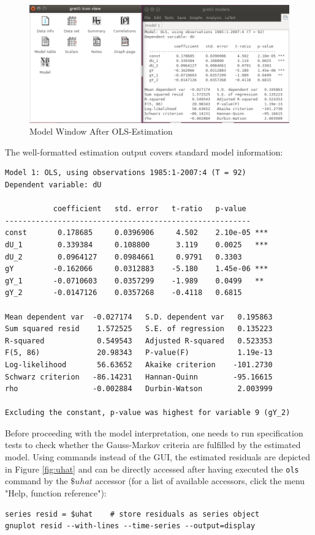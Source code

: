 \documentclass[11pt]{article}
\begin{document}
\begin{figure}[!h]
	\centering
	\includegraphics[width=.72\textwidth]{../figures/gui_model}
	\caption{Model Window After OLS-Estimation}
	\label{fig:gui_model}
\end{figure}


The well-formatted estimation output covers standard model information:
\begin{Verbatim}[baselinestretch=0.75, fontsize=\small]
Model 1: OLS, using observations 1985:1-2007:4 (T = 92)
Dependent variable: dU

           coefficient   std. error   t-ratio   p-value 
--------------------------------------------------------
const       0.178685     0.0396906     4.502    2.10e-05 ***
dU_1        0.339384     0.108800      3.119    0.0025   ***
dU_2        0.0964127    0.0984661     0.9791   0.3303  
gY         -0.162066     0.0312883    -5.180    1.45e-06 ***
gY_1       -0.0710603    0.0357299    -1.989    0.0499   **
gY_2       -0.0147126    0.0357268    -0.4118   0.6815  

Mean dependent var  -0.027174   S.D. dependent var   0.195863
Sum squared resid    1.572525   S.E. of regression   0.135223
R-squared            0.549543   Adjusted R-squared   0.523353
F(5, 86)             20.98343   P-value(F)           1.19e-13
Log-likelihood       56.63652   Akaike criterion    -101.2730
Schwarz criterion   -86.14231   Hannan-Quinn        -95.16615
rho                 -0.002884   Durbin-Watson        2.003999

Excluding the constant, p-value was highest for variable 9 (gY_2)
\end{Verbatim}

Before proceeding with the model interpretation, one needs to run specification tests to check whether the Gauss-Markov criteria are fulfilled by the estimated model. Using commands instead of the GUI, the estimated residuals are depicted in Figure \ref{fig:uhat} and can be directly accessed after having executed the \texttt{ols} command by the $ \$uhat $ accessor (for a list of available accessors, click the menu "Help, function reference"):
\begin{Verbatim}[baselinestretch=0.75, fontsize=\small]
series resid = $uhat	# store residuals as series object
gnuplot resid --with-lines --time-series --output=display
\end{Verbatim}
\end{document}

